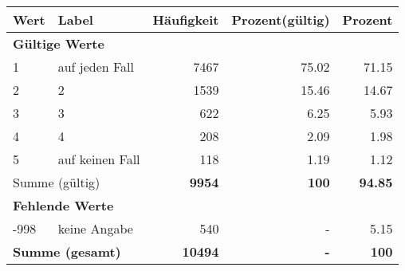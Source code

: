      \begin{longtable}{lXrrr}
     \toprule
     \textbf{Wert} & \textbf{Label} & \textbf{Häufigkeit} & \textbf{Prozent(gültig)} & \textbf{Prozent} \\
     \endhead
     \midrule
     \multicolumn{5}{l}{\textbf{Gültige Werte}}\\

     1 &
     \multicolumn{1}{X}{ auf jeden Fall   } &


       \num{7467} &
       \num[round-mode=places,round-precision=2]{75.02} &
         \num[round-mode=places,round-precision=2]{71.15} \\

     2 &
     \multicolumn{1}{X}{ 2   } &


       \num{1539} &
       \num[round-mode=places,round-precision=2]{15.46} &
         \num[round-mode=places,round-precision=2]{14.67} \\

     3 &
     \multicolumn{1}{X}{ 3   } &


       \num{622} &
       \num[round-mode=places,round-precision=2]{6.25} &
         \num[round-mode=places,round-precision=2]{5.93} \\

     4 &
     \multicolumn{1}{X}{ 4   } &


       \num{208} &
       \num[round-mode=places,round-precision=2]{2.09} &
         \num[round-mode=places,round-precision=2]{1.98} \\

     5 &
     \multicolumn{1}{X}{ auf keinen Fall   } &


       \num{118} &
       \num[round-mode=places,round-precision=2]{1.19} &
         \num[round-mode=places,round-precision=2]{1.12} \\
     \midrule
     \multicolumn{2}{l}{Summe (gültig)} &
       \textbf{\num{9954}} &
     \textbf{\num{100}} &
       \textbf{\num[round-mode=places,round-precision=2]{94.85}} \\
     \multicolumn{5}{l}{\textbf{Fehlende Werte}}\\
       -998 &
       keine Angabe &
         \num{540} &
        - &
         \num[round-mode=places,round-precision=2]{5.15} \\
     \midrule
     \multicolumn{2}{l}{\textbf{Summe (gesamt)}} &
          \textbf{\num{10494}} &
        \textbf{-} &
        \textbf{\num{100}} \\
     \bottomrule
     \end{longtable}
     
